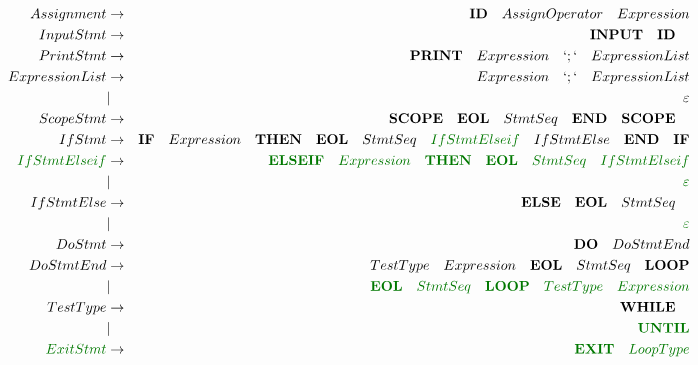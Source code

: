 \documentclass[a4paper,11pt,landscape,leqno]{article}
\begin{document}
\begin{eqnarray}
Assignment	& \rightarrow		& \textbf{ID}\quad AssignOperator \quad Expression \\
InputStmt	&	 \rightarrow	& \textbf{INPUT}\quad \textbf{ID}\quad	 \\
PrintStmt	&	 \rightarrow	& \textbf{PRINT}\quad Expression\quad `;` \quad ExpressionList\\
ExpressionList&  \rightarrow	&  Expression\quad `;`\quad ExpressionList\\
			&	 |				& \varepsilon	\\
ScopeStmt	&	 \rightarrow	&	\textbf{SCOPE}\quad   \textbf{EOL} \quad StmtSeq\quad	 \textbf{END}\quad \textbf{SCOPE}\quad	  \\
IfStmt	&\rightarrow& \textbf{IF} \quad Expression \quad \textbf{THEN}\quad \textbf{EOL}\quad StmtSeq \quad \textcolor{green1}{IfStmtElseif}\quad IfStmtElse\quad \textbf{END}\quad \textbf{IF}	\\
\textcolor{green1}{IfStmtElseif}&\rightarrow &\textcolor{green1}{\textbf{ELSEIF}\quad Expression\quad \textbf{THEN}\quad \textbf{EOL}\quad StmtSeq \quad IfStmtElseif}	 \\
&	|	&\textcolor{green1}{\varepsilon}  \\
IfStmtElse&   \rightarrow &\textbf{ELSE}\quad  \textbf{EOL}\quad StmtSeq\quad  \\
&	|	&\textcolor{green1}{\varepsilon}  \\
DoStmt&    \rightarrow	  & \textbf{DO} \quad DoStmtEnd   \\
DoStmtEnd&	 \rightarrow  &  TestType \quad  Expression \quad \textbf{EOL} \quad StmtSeq \quad \textbf{LOOP}	\\
&	 | &\textcolor{green1}{\textbf{EOL} \quad StmtSeq \quad \textbf{LOOP}\quad TestType \quad  Expression} \\
TestType & \rightarrow	&	\textbf{WHILE}\quad \\
		&		|		& \textcolor{green1}{\textbf{UNTIL}} \\
\textcolor{green1}{ExitStmt} & \rightarrow & \textcolor{green1}{\textbf{EXIT}\quad LoopType}	\\

\end{eqnarray}
\end{document}
